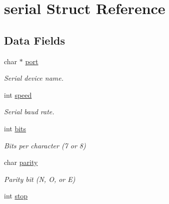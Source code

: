 \hypertarget{structserial}{}\section{serial Struct Reference}
\label{structserial}
\subsection*{Data Fields}
\begin{DoxyCompactItemize}
\item 
\mbox{\label{structserial_aa580759728df3298cdd37fef46459040}} 
char $\ast$ \hyperlink{structserial_aa580759728df3298cdd37fef46459040}{port}
\begin{DoxyCompactList}\small\item\em Serial device name. \end{DoxyCompactList}\item 
\mbox{\label{structserial_a366233b5459782dca82c5b5c28dcd066}} 
int \hyperlink{structserial_a366233b5459782dca82c5b5c28dcd066}{speed}
\begin{DoxyCompactList}\small\item\em Serial baud rate. \end{DoxyCompactList}\item 
\mbox{\label{structserial_a8a92bf8709c05cdaed2f888396296c2a}} 
int \hyperlink{structserial_a8a92bf8709c05cdaed2f888396296c2a}{bits}
\begin{DoxyCompactList}\small\item\em Bits per character (7 or 8) \end{DoxyCompactList}\item 
\mbox{\label{structserial_a948f0bf5113570f168cd030c3a71a887}} 
char \hyperlink{structserial_a948f0bf5113570f168cd030c3a71a887}{parity}
\begin{DoxyCompactList}\small\item\em Parity bit (\textquotesingle{}N\textquotesingle{}, \textquotesingle{}O\textquotesingle{}, or \textquotesingle{}E\textquotesingle{}) \end{DoxyCompactList}\item 
\mbox{\label{structserial_ad9c26f97e179a67c08b8a0253c05bb58}} 
int \hyperlink{structserial_ad9c26f97e179a67c08b8a0253c05bb58}{stop}

\end{DoxyCompactItemize}
